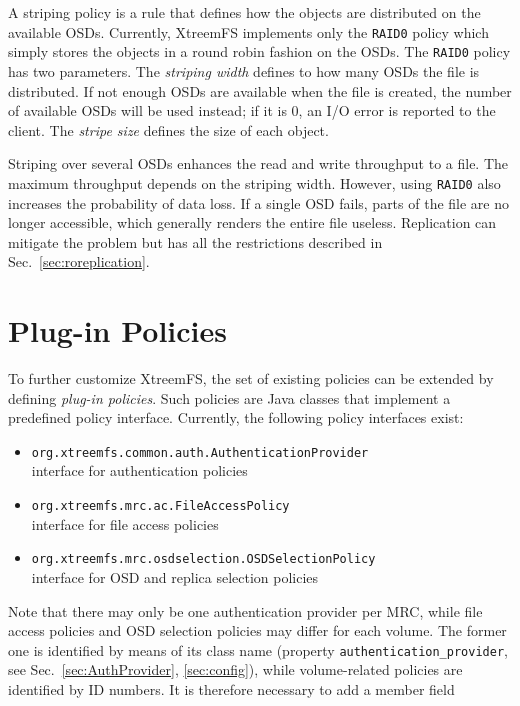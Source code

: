 \documentclass[a4paper,10pt]{book}
\begin{document}
A striping policy is a rule that defines how the objects are distributed on the available OSDs. Currently, XtreemFS implements only the \texttt{RAID0} policy which simply stores the objects in a round robin fashion on the OSDs. The \texttt{RAID0} policy has two parameters. The \emph{striping width} defines to how many OSDs the file is distributed. If not enough OSDs are available when the file is created, the number of available OSDs will be used instead; if it is 0, an I/O error is reported to the client. The \emph{stripe size} defines the size of each object.

Striping over several OSDs enhances the read and write throughput to a file. The maximum throughput depends on the striping width. However, using \texttt{RAID0} also increases the probability of data loss. If a single OSD fails, parts of the file are no longer accessible, which generally renders the entire file useless. Replication can mitigate the problem but has all the restrictions described in Sec.\ \ref{sec:roreplication}.


\section{Plug-in Policies}

To further customize XtreemFS, the set of existing policies can be extended by defining \textit{plug-in policies}. Such policies are Java classes that implement a predefined policy interface. Currently, the following policy interfaces exist:

\begin{itemize}
 \item \texttt{org.xtreemfs.common.auth.AuthenticationProvider}\\
   interface for authentication policies
 \item \texttt{org.xtreemfs.mrc.ac.FileAccessPolicy}\\
   interface for file access policies
 \item \texttt{org.xtreemfs.mrc.osdselection.OSDSelectionPolicy}\\
   interface for OSD and replica selection policies
\end{itemize}

Note that there may only be one authentication provider per MRC, while file access policies and OSD selection policies may differ for each volume. The former one is identified by means of its class name (property \texttt{authentication\_provider}, see Sec.\ \ref{sec:AuthProvider}, \ref{sec:config}), while volume-related policies are identified by ID numbers. It is therefore necessary to add a member field
\end{document}
